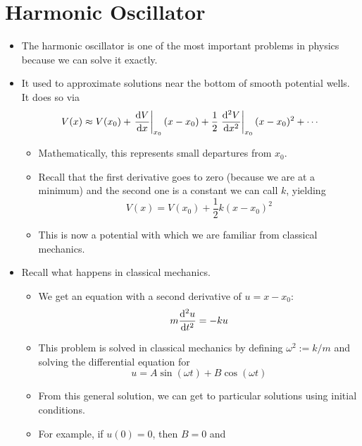 \documentclass[../notes.tex]{subfiles}
\begin{document}
\section{Harmonic Oscillator}
\begin{itemize}
    \item {}The harmonic oscillator is one of the most important problems in physics because we can solve it exactly.
    \item It used to approximate solutions near the bottom of smooth potential wells. It does so via
    \begin{equation*}
        V(x) \approx V(x_0)+\eval{\dv{V}{x}}_{x_0}(x-x_0)+\frac{1}{2}\eval{\dv[2]{V}{x}}_{x_0}(x-x_0)^2+\cdots
    \end{equation*}
    \begin{itemize}
        \item Mathematically, this represents small departures from $x_0$.
        \item Recall that the first derivative goes to zero (because we are at a minimum) and the second one is a constant we can call $k$, yielding
        \begin{equation*}
            V(x) = V(x_0)+\frac{1}{2}k(x-x_0)^2
        \end{equation*}
        \item This is now a potential with which we are familiar from classical mechanics.
    \end{itemize}
    \item Recall what happens in classical mechanics.
    \begin{itemize}
        \item We get an equation with a second derivative of $u=x-x_0$:
        \begin{equation*}
            m\dv[2]{u}{t} = -ku
        \end{equation*}
        \item This problem is solved in classical mechanics by defining $\omega^2:=k/m$ and solving the differential equation for
        \begin{equation*}
            u = A\sin(\omega t)+B\cos(\omega t)
        \end{equation*}
        \item From this general solution, we can get to particular solutions using initial conditions.
        \item For example, if $u(0)=0$, then $B=0$ and
        \begin{equation*}

\end{equation*}
\end{itemize}
\end{itemize}
\end{document}
